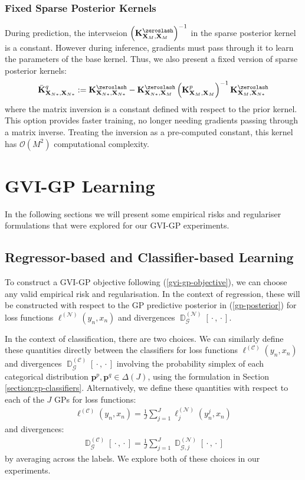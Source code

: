 \documentclass{article}
\newcommand{\D}{\operatorname{\mathbb{D}}}
\newcommand{\wc}{\operatorname{{}\cdot{}}}
\numberwithin{equation}{section}
\begin{document}
\subsubsection{Fixed Sparse Posterior Kernels}
During prediction, the intervseion $\left( \mathbf{K}^{\zeroslash}_{\mathbf{X}_M, \mathbf{X}_M} \right)^{-1}$ in the sparse posterior kernel is a constant. However during inference, gradients must pass through it to learn the parameters of the base kernel. Thus, we also present a fixed version of sparse posterior kernels:
\begin{align}
            \bar{\mathbf{K}}^q_{\mathbf{X}_{N*}, \mathbf{X}_{N*}} := \mathbf{K}^{\zeroslash}_{\mathbf{X}_{N*}, \mathbf{X}_{N*}} - \mathbf{K}^{\zeroslash}_{\mathbf{X}_{N*}, \mathbf{X}_M} \left( \mathbf{K}^{p}_{\mathbf{X}_M, \mathbf{X}_M} \right)^{-1} \mathbf{K}^{\zeroslash}_{\mathbf{X}_M, \mathbf{X}_{N*}}
\end{align}
where the matrix inversion is a constant defined with respect to the prior kernel. This option provides faster training, no longer needing gradients passing through a matrix inverse. Treating the inversion as a pre-computed constant, this kernel has $\mathcal{O}(M^2)$ computational complexity.

\newpage
\section{GVI-GP Learning}\label{section:gvi-gp-learning}
In the following sections we will present some empirical risks and regulariser formulations that were explored for our GVI-GP experiments.

\subsection{Regressor-based and Classifier-based Learning}
To construct a GVI-GP objective following (\ref{gvi-gp-objective}), we can choose any valid empirical risk and regularisation. In the context of regression, these will be constructed with respect to the GP predictive posterior in (\ref{gp-posterior}) for loss functions $\ell^{(\mathcal{N})}(y_n, x_n)$ and divergences $\D_{\mathcal{G}}^{(\mathcal{N})}[\wc, \wc]$.

In the context of classification, there are two choices. We can similarly define these quantities directly between the classifiers for loss functions $\ell^{(\mathcal{C})}(y_n, x_n)$ and divergences $\D^{(\mathcal{C})}_{\mathcal{G}}[\wc, \wc]$ involving the probability simplex of each categorical distribution $\mathbf{p}^p, \mathbf{p}^q \in \Delta(J)$, using the formulation in Section \ref{section:gp-classifiers}. Alternatively, we define these quantities with respect to each of the $J$ GPs for loss functions:
\begin{align}
    \ell^{(\mathcal{C})}(y_n, x_n) = \frac{1}{J}\sum_{j=1}^{J}\ell_j^{(\mathcal{N})}(y^j_n, x_n)
\end{align}
and divergences:
\begin{align}
    \D^{(\mathcal{C})}_{\mathcal{G}}[\wc, \wc] = \frac{1}{J}\sum_{j=1}^{J}\D_{\mathcal{G}, j}^{(\mathcal{N})}[\wc, \wc]
\end{align}
by averaging across the labels. We explore both of these choices in our experiments. 
\end{document}
